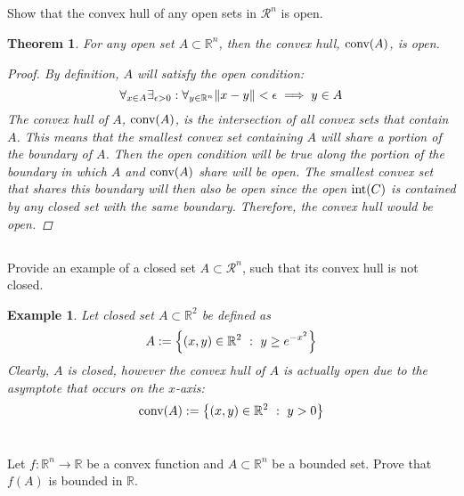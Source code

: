 \documentclass[]{article}
\newcommand{\R}{\mathbb{R}}
\newcommand{\st}{\ : \ }
\newtheorem{theorem}{Theorem}
\newtheorem{example}{Example}
\begin{document}
\subsection{}
Show that the convex hull of any open sets in $\mathcal{R}^n$ is open.

\begin{theorem}
    For any open set $A \subset \R^n$,
    then the convex hull, $\textnormal{conv}(A)$,
    is open.
    \begin{proof}
        By definition, $A$ will satisfy the open condition:\[
            \forall_{x \in A} \exists_{\epsilon>0} : \forall_{y \in \R^n}\norm{x - y} < \epsilon \implies y \in A
        \]
        The convex hull of $A$, $\textnormal{conv}(A)$, is the intersection of all convex sets that contain $A$.
        This means that the smallest convex set containing $A$ will share a portion of the boundary of $A$.
        Then the open condition will be true along the portion of the boundary in which $A$ and $\textnormal{conv}(A)$ share will be open.
        The smallest convex set that shares this boundary will then also be open since the open $\textnormal{int}(C)$ is contained by any closed set with the same boundary.
        Therefore, the convex hull would be open.
    \end{proof}
\end{theorem}

\subsection{}
Provide an example of a closed set $A \subset \mathcal{R}^n$, such that its convex hull is not closed.

\begin{example}
    Let closed set $A \subset \R^2$ be defined as\[
        A := \qty{
            (x,y) \in \R^2 \st y \geq e^{-x^2}
        }
    \]
    Clearly, $A$ is closed, however the convex hull of $A$ is actually open due to the asymptote that occurs on the $x$-axis:\[
        \textnormal{conv}(A) := \qty{
            (x,y) \in \R^2 \st y > 0
        }
    \]
\end{example}

\newpage
\section{}
Let $f : \R^n \to \R$ be a convex function and $A \subset \R^n$ be a bounded set.
Prove that $f(A)$ is bounded in $\R$.
\end{document}
